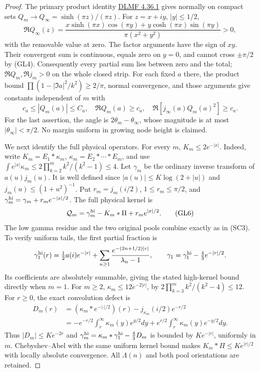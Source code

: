 \documentclass[11pt]{article}
\theoremstyle{remark}\newtheorem{remark}[theorem]{Remark}
\begin{document}
\begin{proof}
The primary product identity
\href{https://dlmf.nist.gov/4.36.E1}{DLMF 4.36.1} gives normally
on compact sets \(Q_m\to Q_\infty=\sinh(\pi z)/(\pi z)\).
For \(z=x+iy\), \(|y|\le1/2\),
\[
 \Re Q_\infty(z)=
 \frac{x\sinh(\pi x)\cos(\pi y)+y\cosh(\pi x)\sin(\pi y)}
      {\pi(x^2+y^2)}>0,                               \tag{GL4}
\]
with the removable value at zero. The factor arguments have
the sign of \(xy\). Their convergent sum is continuous, equals
zero on \(y=0\), and cannot cross \(\pm\pi/2\) by (GL4).
Consequently every partial sum lies between zero and the total;
\(\Re Q_m,\Re j_m>0\) on the whole closed strip. For each
fixed \(a\) there, the product bound
\(\prod(1-|\Im a|^2/k^2)\ge2/\pi\), normal convergence,
and those arguments give constants independent of \(m\) with
\[
 c_a\le|Q_m(a)|\le C_a,\quad \Re Q_m(a)\ge c_a,
             \quad\Re[j_\infty(a)Q_m(a)^2]\ge c_a.    \tag{GL5}
\]
For the last assertion, the angle is
\(2\theta_m-\theta_\infty\), whose magnitude is at most
\(|\theta_\infty|<\pi/2\). No margin uniform in growing
node height is claimed.

We next identify the full physical operators. For every \(m\),
\(K_m\le2e^{-|x|}\). Indeed, write
\(K_m=E_1*\kappa_m\), \(\kappa_m=E_2*\cdots*E_m\),
and use
\(\int e^{|x|}\kappa_m\le2\prod_{k=2}^m k^2/(k^2-1)\le4\).
Let \(\gamma_m\) be the ordinary inverse transform of
\(a(u)j_m(u)\). It is well defined since
\(|a(u)|\le K\log(2+|u|)\) and \(j_m(u)\le(1+u^2)^{-1}\).
Put \(r_m=j_m(i/2)\), \(1\le r_m\le\pi/2\), and
\(\gamma_m^{\rm hi}=\gamma_m+r_me^{-|x|/2}\).
The full physical kernel is
\[
 \mathcal Q_m=\gamma_m^{\rm hi}-K_m*\Pi+r_me^{|x|/2}.
                                                               \tag{GL6}
\]
The low gamma residue and the two original pools combine exactly
as in (SC3). To verify uniform tails, the first partial fraction is
\[
 \gamma_1^{\rm hi}(r)=\tfrac12a(i)e^{-|r|}
       +\sum_{n\ge1}\frac{e^{-(2n+1/2)|r|}}{\lambda_n-1},
 \qquad \gamma_1=\gamma_1^{\rm hi}-\tfrac43e^{-|r|/2}.
\]
Its coefficients are absolutely summable, giving the stated
high-kernel bound directly when \(m=1\). For \(m\ge2\),
\(\kappa_m\le12e^{-2|r|}\), by
\(2\prod_{k=3}^m k^2/(k^2-4)\le12\).
For \(r\ge0\), the exact convolution defect is
\[
 \begin{split}
 D_m(r)&=(\kappa_m*e^{-|\cdot|/2})(r)
                  -j_{\kappa_m}(i/2)e^{-r/2}\\
 &=-e^{-r/2}\int_r^\infty\kappa_m(y)e^{y/2}dy
        +e^{r/2}\int_r^\infty\kappa_m(y)e^{-y/2}dy.
 \end{split}
\]
Thus \(|D_m|\le Ke^{-2r}\) and
\(\gamma_m^{\rm hi}=\kappa_m*\gamma_1^{\rm hi}-\frac43D_m\)
is bounded by \(Ke^{-|r|}\), uniformly in \(m\).
Chebyshev--Abel with the same uniform kernel bound makes
\(K_m*\Pi\le Ke^{|r|/2}\) with locally absolute convergence.
All \(\Lambda(n)\) and both pool orientations are retained.


\end{proof}
\end{document}
